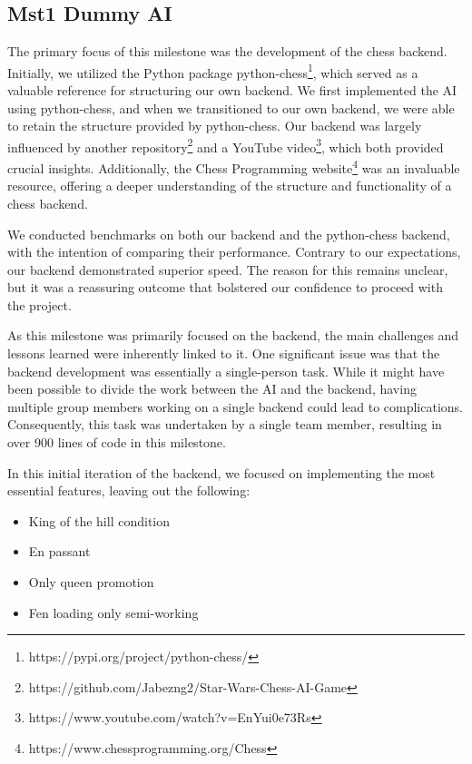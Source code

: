 \subsection{Mst1 Dummy AI}

The primary focus of this milestone was the development of the chess backend. Initially, we utilized the Python package python-chess\footnote{https://pypi.org/project/python-chess/}, which served as a valuable reference for structuring our own backend. We first implemented the AI using python-chess, and when we transitioned to our own backend, we were able to retain the structure provided by python-chess. Our backend was largely influenced by another repository\footnote{https://github.com/Jabezng2/Star-Wars-Chess-AI-Game} and a YouTube video\footnote{https://www.youtube.com/watch?v=EnYui0e73Rs}, which both provided crucial insights. Additionally, the Chess Programming website\footnote{https://www.chessprogramming.org/Chess} was an invaluable resource, offering a deeper understanding of the structure and functionality of a chess backend.

We conducted benchmarks on both our backend and the python-chess backend, with the intention of comparing their performance. Contrary to our expectations, our backend demonstrated superior speed. The reason for this remains unclear, but it was a reassuring outcome that bolstered our confidence to proceed with the project.

As this milestone was primarily focused on the backend, the main challenges and lessons learned were inherently linked to it. One significant issue was that the backend development was essentially a single-person task. While it might have been possible to divide the work between the AI and the backend, having multiple group members working on a single backend could lead to complications. Consequently, this task was undertaken by a single team member, resulting in over 900 lines of code in this milestone.

In this initial iteration of the backend, we focused on implementing the most essential features, leaving out the following:

\begin{itemize}
  \item{King of the hill condition}
  \item{En passant}
  \item{Only queen promotion}
  \item{Fen loading only semi-working}
\end{itemize}

